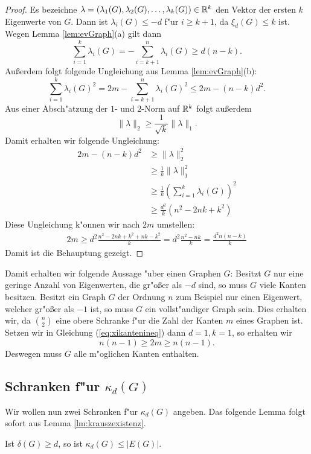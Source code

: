 \begin{proof}
  Es bezeichne $\lambda = (\lambda_{1}(G),\lambda_{2}(G), \dots , \lambda_{k}(G))\in {\mathbb{R}}^{k}$ den Vektor der ersten $k$ Eigenwerte von $G$. Dann ist $\lambda_{i}(G) \leq -d$ f"ur $i \geq k+1$, da $\xi_{d}(G) \leq k$ ist.
  Wegen Lemma \ref{lem:evGraph}(a) gilt dann 
  $$
  \sum\limits_{i=1}^{k} \lambda_{i}(G) = - \sum\limits_{i=k+1}^{n} \lambda_{i}(G) \geq d(n-k).
  $$
  Au{\ss}erdem folgt folgende Ungleichung aus Lemma \ref{lem:evGraph}(b):
  $$ \sum\limits_{i=1}^{k} \lambda_{i}(G)^{2} = 2m - \sum\limits_{i=k+1}^{n} \lambda_{i}(G) ^{2} \leq 2m - (n-k)d^{2}.$$
  Aus einer Absch"atzung der $1$- und $2$-Norm auf ${\mathbb{R}}^{k}$ folgt au{\ss}erdem 
  $$\| \lambda \|_{2} \geq \frac{1}{\sqrt{k}} \|\lambda\|_{1}.$$
  Damit erhalten wir folgende Ungleichung:
  \begin{align*}
    2m - (n-k)d^{2} &\geq \| \lambda \| _{2}^{2} \\
    & \geq \frac{1}{k} \| \lambda \| _1^{2} \\
    & \geq \frac{1}{k} ( \sum\limits_{i=1}^{k} \lambda_{i}(G))^{2} \\
    & \geq \frac{d^{2}}{k}(n^{2}-2nk+k^{2})
  \end{align*}
  Diese Ungleichung k"onnen wir nach $2m$ umstellen:
  \begin{align*}
    2m \geq d^{2}\frac{n^{2}-2nk + k^{2}+ nk - k^{2} }{k} = d^{2}\frac{n^{2}-nk}{k} = \frac{d^{2}n(n-k)}{k}
  \end{align*}
  Damit ist die Behauptung gezeigt.
\end{proof}
Damit erhalten wir folgende Aussage "uber einen Graphen $G$: Besitzt $G$ nur eine geringe Anzahl von Eigenwerten, die gr"o{\ss}er als $-d$ sind, so muss $G$ viele Kanten besitzen. Besitzt ein Graph $G$ der Ordnung $n$ zum Beispiel nur einen Eigenwert, welcher gr"o{\ss}er als $-1$ ist, so muss $G$ ein vollst"andiger Graph sein. 
Dies erhalten wir, da $\binom{n}{2}$ eine obere Schranke f"ur die Zahl der Kanten $m$ eines Graphen ist. Setzen wir in Gleichung (\ref{eq:xikantenineq}) dann $d=1, k=1$, so erhalten wir 
\begin{equation*}
  n(n-1) \geq 2m \geq n(n-1).
\end{equation*}
Deswegen muss  $G$ alle m"oglichen Kanten enthalten.
\subsection{Schranken f"ur $\kappa_d(G)$}

Wir wollen nun zwei Schranken f"ur $\kappa_{d}(G)$ angeben. Das folgende Lemma folgt sofort aus Lemma \ref{lm:krauszexistenz}. 
\begin{lemma}
  Ist $\delta(G) \geq d$, so ist $\kappa_{d}(G) \leq |E(G)|$. 
\end{lemma}

